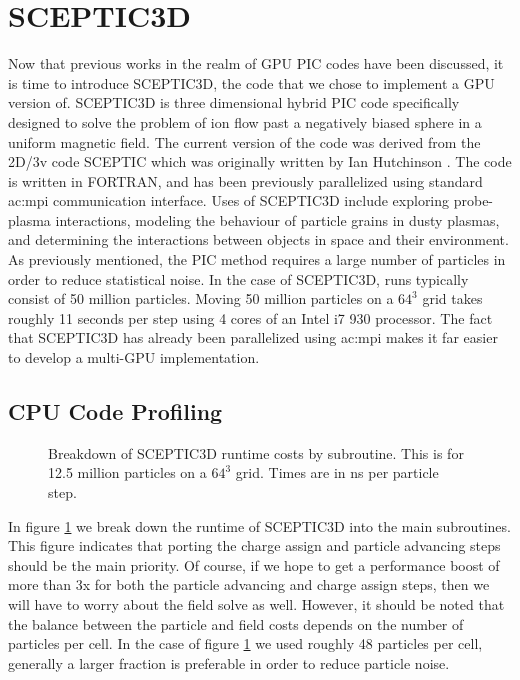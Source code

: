 		

	\section{SCEPTIC3D}
Now that previous works in the realm of GPU PIC codes have been discussed, it is time to introduce SCEPTIC3D, the code that we chose to implement a GPU version of. SCEPTIC3D is three dimensional hybrid PIC code specifically designed to solve the problem of ion flow past a negatively biased sphere in a uniform magnetic field. The current version of the code was derived from the 2D/3v code SCEPTIC which was originally written by Ian Hutchinson \cite{Hutchinson2002,Hutchinson2003,Hutchinson2005,Hutchinson2006}. The code is written in FORTRAN, and has been previously parallelized using standard \gls{ac:mpi} communication interface. Uses of SCEPTIC3D include exploring probe-plasma interactions, modeling the behaviour of particle grains in dusty plasmas, and determining the interactions between objects in space and their environment. As previously mentioned, the PIC method requires a large number of particles in order to reduce statistical noise. In the case of SCEPTIC3D, runs typically consist of 50 million particles.
Moving 50 million particles on a $64^3$ grid takes roughly 11 seconds per step using 4 cores of an Intel i7 930 processor. The fact that SCEPTIC3D has already been parallelized using \gls{ac:mpi} makes it far easier to develop a multi-GPU implementation. 

	\subsection{CPU Code Profiling}


\begin{figure}
\begin{center}

\end{center}
\caption[Breakdown of SCEPTIC3D runtime costs]{Breakdown of SCEPTIC3D runtime costs by subroutine. This is for 12.5 million particles on a $64^3$ grid. Times are in ns per particle step.}
\label{fig:sceptic3D_profile}
\end{figure}

In figure \ref{fig:sceptic3D_profile} we break down the runtime of SCEPTIC3D into the main subroutines. This figure indicates that porting the charge assign and particle advancing steps should be the main priority. Of course, if we hope to get a performance boost of more than 3x for both the particle advancing and charge assign steps, then we will have to worry about the field solve as well. However, it should be noted that the balance between the particle and field costs depends on the number of particles per cell. In the case of figure \ref{fig:sceptic3D_profile} we used roughly 48 particles per cell, generally a larger fraction is preferable in order to reduce particle noise. 

